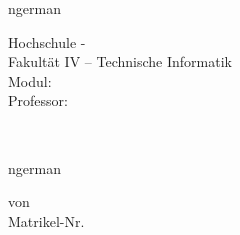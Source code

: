 \begin{titlepage}
  \pagestyle{empty}
  \centering

  \vspace*{0.5cm}
  \begin{otherlanguage*}{ngerman}
    \begin{sffamily} {
        \Large
        Hochschule -\\[1em]
        Fakultät IV -- Technische Informatik\\[0.1em]
        Modul: \modul\\[0.1em]
        Professor: \pruefer\\[0.1em]
      }
    \end{sffamily}
  \end{otherlanguage*}

  \vspace*{3cm}

  \begin{sffamily}
    \huge \bfseries
    \makeatletter
    \@title
    \makeatother
    \\
  \end{sffamily}

  \vspace*{1cm}

  \begin{otherlanguage*}{ngerman}
    
    \vspace*{3cm}
    
    von\\[0.75em]
    {
      \large
      \textbf{\authorA}\quad Matrikel-Nr. \matrikelnrA\\

      \vspace*{2cm}
      \makeatletter
      \@date
      \makeatother
    }
    \vfill
  \end{otherlanguage*}
\end{titlepage}